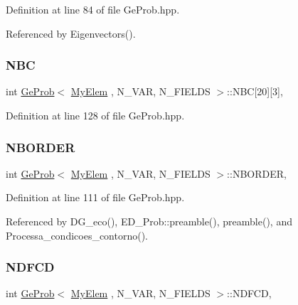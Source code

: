 Definition at line 84 of file Ge\+Prob.\+hpp.



Referenced by Eigenvectors().

\mbox{\label{classGeProb_a5fb604ebcc5130a7ad4719d5f6578cb9}} 
\subsubsection{\texorpdfstring{N\+BC}{NBC}}
{\footnotesize\ttfamily int \hyperlink{classGeProb}{Ge\+Prob}$<$ \hyperlink{DG__Prob_8h_a83cd887ced9a6587428f267e50cd4787}{My\+Elem} , N\+\_\+\+V\+AR, N\+\_\+\+F\+I\+E\+L\+DS $>$\+::N\+BC\mbox{[}20\mbox{]}\mbox{[}3\mbox{]}\hspace{0.3cm}{\ttfamily [protected]}, {\ttfamily [inherited]}}



Definition at line 128 of file Ge\+Prob.\+hpp.

\mbox{\label{classGeProb_a7ff7ce9c7e12c1bb099c41b7fdc91d7d}} 
\subsubsection{\texorpdfstring{N\+B\+O\+R\+D\+ER}{NBORDER}}
{\footnotesize\ttfamily int \hyperlink{classGeProb}{Ge\+Prob}$<$ \hyperlink{DG__Prob_8h_a83cd887ced9a6587428f267e50cd4787}{My\+Elem} , N\+\_\+\+V\+AR, N\+\_\+\+F\+I\+E\+L\+DS $>$\+::N\+B\+O\+R\+D\+ER\hspace{0.3cm}{\ttfamily [protected]}, {\ttfamily [inherited]}}



Definition at line 111 of file Ge\+Prob.\+hpp.



Referenced by D\+G\+\_\+eco(), E\+D\+\_\+\+Prob\+::preamble(), preamble(), and Processa\+\_\+condicoes\+\_\+contorno().

\mbox{\label{classGeProb_a2894b14d50728f945721f2c85e1fba4d}} 
\subsubsection{\texorpdfstring{N\+D\+F\+CD}{NDFCD}}
{\footnotesize\ttfamily int \hyperlink{classGeProb}{Ge\+Prob}$<$ \hyperlink{DG__Prob_8h_a83cd887ced9a6587428f267e50cd4787}{My\+Elem} , N\+\_\+\+V\+AR, N\+\_\+\+F\+I\+E\+L\+DS $>$\+::N\+D\+F\+CD\hspace{0.3cm}{\ttfamily [protected]}, {\ttfamily [inherited]}}




